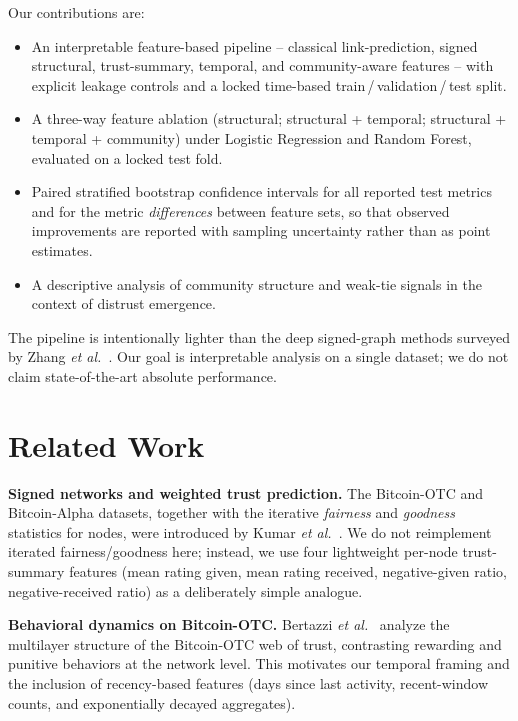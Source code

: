 \documentclass[conference]{IEEEtran}
\begin{document}
Our contributions are:
\begin{itemize}
\item An interpretable feature-based pipeline -- classical
link-prediction, signed structural, trust-summary, temporal, and
community-aware features -- with explicit leakage controls and a
locked time-based train\,/\,validation\,/\,test split.
\item A three-way feature ablation (structural; structural + temporal;
structural + temporal + community) under Logistic Regression and
Random Forest, evaluated on a locked test fold.
\item Paired stratified bootstrap confidence intervals for all
reported test metrics and for the metric \emph{differences} between
feature sets, so that observed improvements are reported with sampling
uncertainty rather than as point estimates.
\item A descriptive analysis of community structure and weak-tie
signals in the context of distrust emergence.
\end{itemize}

The pipeline is intentionally lighter than the deep signed-graph
methods surveyed by Zhang \emph{et al.}~\cite{zhang2024}. Our goal is
interpretable analysis on a single dataset; we do not claim
state-of-the-art absolute performance.

\section{Related Work}

\textbf{Signed networks and weighted trust prediction.} The
Bitcoin-OTC and Bitcoin-Alpha datasets, together with the iterative
\emph{fairness} and \emph{goodness} statistics for nodes, were
introduced by Kumar \emph{et al.}~\cite{kumar2016}. We do not
reimplement iterated fairness/goodness here; instead, we use four
lightweight per-node trust-summary features (mean rating given, mean
rating received, negative-given ratio, negative-received ratio) as a
deliberately simple analogue.

\textbf{Behavioral dynamics on Bitcoin-OTC.} Bertazzi
\emph{et al.}~\cite{bertazzi2018} analyze the multilayer structure of
the Bitcoin-OTC web of trust, contrasting rewarding and punitive
behaviors at the network level. This motivates our temporal framing and the inclusion of recency-based features (days since
last activity, recent-window counts, and exponentially decayed
aggregates).
\end{document}
